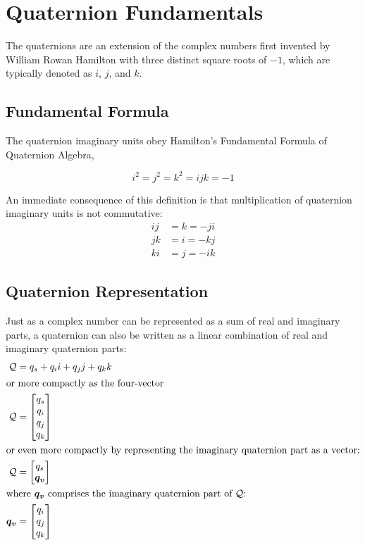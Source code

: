  \section{Quaternion Fundamentals}\label{sec:app_fund}
  
 The quaternions are an extension of the complex numbers
 first invented by William Rowan Hamilton with three distinct square roots of $-1$, which are
 typically denoted as $i$, $j$, and $k$.

\subsection{Fundamental Formula}

The quaternion imaginary units obey Hamilton's Fundamental Formula of Quaternion Algebra,

\begin{equation}
i^2 = j^2 = k^2 = ijk = -1 \label{eqn:quat_fundamental_formula}
\end{equation}

An immediate consequence of this definition is that multiplication of quaternion imaginary units is not commutative:
\begin{subequations}
\begin{align}
ij &= k = -ji \\
jk &= i = -kj \\
ki &= j = -ik
\end{align}
\end{subequations}


\subsection{Quaternion Representation}\label{sec:app_rep}

Just as  a complex number can be represented as a sum of real and imaginary parts, a quaternion can also be written as a linear combination of real and imaginary quaternion parts:
\begin{align}
\quat Q &= q_s + q_i i + q_j j + q_k k \label{eqn:quat_rep_explicit} \\
\intertext{or more compactly as the four-vector}
\quat Q &= \begin{bmatrix}q_s \\ q_i \\ q_j \\ q_k \end{bmatrix} \label{eqn:quat_rep_4vector}\\
\intertext{or even more compactly by representing the imaginary quaternion part as a vector:}
\quat Q &=\quatsv {q_s} {\vect{q_v}} \label{eqn:quat_rep_scalar_vector}\\
\intertext{where $\vect{q_v}$ comprises the imaginary quaternion part of $\quat Q$:}
\vect{q_v} &= \begin{bmatrix} q_i \\ q_j \\ q_k \end{bmatrix} \label{eqn:quat_vector_part}
\end{align}

